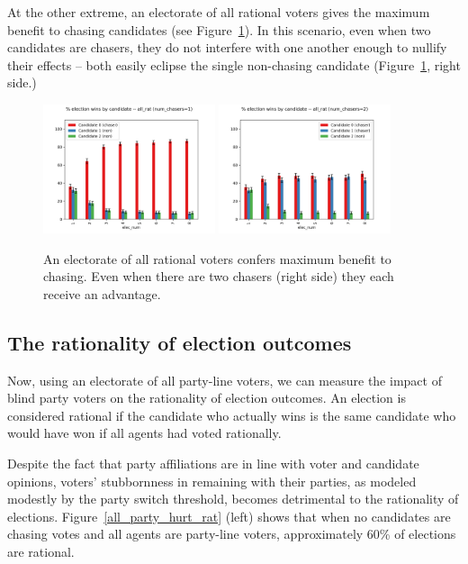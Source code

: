 At the other extreme, an electorate of all rational voters gives the maximum
benefit to chasing candidates (see Figure~\ref{all_rat_chasers_benefit}). In
this scenario, even when two candidates are chasers, they do not interfere with
one another enough to nullify their effects -- both easily eclipse the single
non-chasing candidate (Figure~\ref{all_rat_chasers_benefit}, right side.)

\begin{figure}[ht]
\centering
\includegraphics[width=0.45\textwidth]{assets/all_rat_one_chaser_even_bigger_benefit.png}
\includegraphics[width=0.45\textwidth]{assets/all_rat_two_chasers_even_bigger_benefit.png}
\caption{An electorate of all rational voters confers maximum benefit to
chasing. Even when there are two chasers (right side) they each receive an
advantage.}
\label{all_rat_chasers_benefit}
\end{figure}


\subsection{The rationality of election outcomes}

Now, using an electorate of all party-line voters, we can measure the impact of
blind party voters on the rationality of election outcomes. An election is considered 
rational if the candidate who actually wins is the same candidate who would have 
won if all agents had voted rationally.
 
Despite the fact that
party affiliations are in line with voter and candidate opinions, voters'
stubbornness in remaining with their parties, as modeled modestly by the party switch
threshold, becomes detrimental to the rationality of elections.
Figure~\ref{all_party_hurt_rat} (left) shows that when no candidates are chasing votes and all 
agents are party-line voters, approximately 60\% of elections are rational. 

